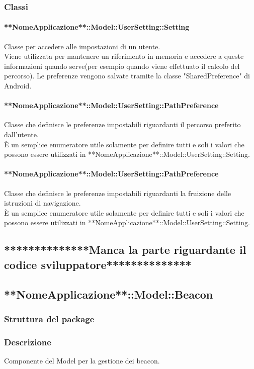 \documentclass[../SpecificaTecnica.tex]{subfiles}
\begin{document}
		\subsubsection{Classi}
			\paragraph{**NomeApplicazione**::Model::UserSetting::Setting}
				Classe per accedere alle impostazioni di un utente. \\
				Viene utilizzata per mantenere un riferimento in memoria e accedere a queste informazioni quando serve(per esempio quando viene effettuato il calcolo del percorso). Le preferenze vengono salvate tramite la classe "SharedPreference" di Android.
			\paragraph{**NomeApplicazione**::Model::UserSetting::PathPreference}
				Classe che definisce le preferenze impostabili riguardanti il percorso preferito dall'utente. \\
				È un semplice enumeratore utile solamente per definire tutti e soli i valori che possono essere utilizzati in **NomeApplicazione**::Model::UserSetting::Setting.
			\paragraph{**NomeApplicazione**::Model::UserSetting::PathPreference}
				Classe che definisce le preferenze impostabili riguardanti la fruizione delle istruzioni di navigazione. \\
				È un semplice enumeratore utile solamente per definire tutti e soli i valori che possono essere utilizzati in **NomeApplicazione**::Model::UserSetting::Setting.
	\subsection{**************Manca la parte riguardante il codice sviluppatore**************}
	\subsection{**NomeApplicazione**::Model::Beacon}
		\subsubsection{Struttura del package}
		\subsubsection{Descrizione}
			Componente del Model per la gestione dei beacon.
\end{document}
